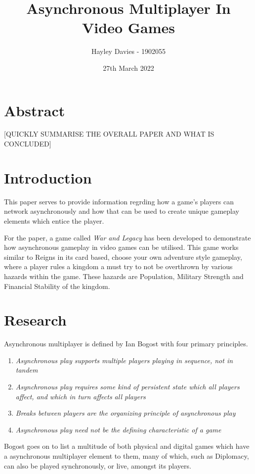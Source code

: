 \documentclass{article}
\title{Asynchronous Multiplayer In Video Games}
\author{Hayley Davies - 1902055}
\date{27th March 2022}
\begin{document}
\maketitle

\section{Abstract}
[QUICKLY SUMMARISE THE OVERALL PAPER AND WHAT IS CONCLUDED]

\section{Introduction}
This paper serves to provide information regrding how a game's players can network asynchronously and how that can be used to create unique gameplay elements which entice the player.

For the paper, a game called \emph{War and Legacy} has been developed to demonstrate how asynchronous gameplay in video games can be utilised. This game works similar to Reigns\cite{reigns2016} in its card based, choose your own adventure style gameplay, where a player rules a kingdom a must try to not be overthrown by various hazards within the game. These hazards are Population, Military Strength and Financial Stability of the kingdom.

\section{Research}
Asynchronous multiplayer is defined by Ian Bogost\cite{bogost2004} with four primary principles.
\begin{enumerate}
    \item \emph{Asynchronous play supports multiple players playing in sequence, not in tandem}
    \item \emph{Asynchronous play requires some kind of persistent state which all players affect, and which in turn affects all players}
    \item \emph{Breaks between players are the organizing principle of asynchronous play}
    \item \emph{Asynchronous play need not be the defining characteristic of a game}
\end{enumerate}

Bogost goes on to list a multitude of both physical and digital games which have a asynchronous multiplayer element to them, many of which, such as Diplomacy\cite{diplomacy1959}, can also be played synchronously, or live, amongst its players.
\end{document}
